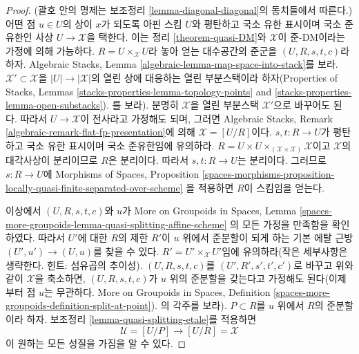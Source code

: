 \begin{proof}
(괄호 안의 명제는 보조정리 \ref{lemma-diagonal-diagonal}의 동치들에서
따른다.) 어떤 점 $u \in U$의 상이 $x$가 되도록 아핀 스킴 $U$와
평탄하고 국소 유한 표시이며 국소 준유한인 사상
$U \to \mathcal{X}$을 택한다. 이는 정리 \ref{theorem-quasi-DM}와
$\mathcal{X}$이 준-DM이라는 가정에 의해 가능하다.
$R = U \times_\mathcal{X} U$라 놓아 얻는 대수공간의 준군을
$(U, R, s, t, c)$라 하자. Algebraic Stacks, Lemma
\ref{algebraic-lemma-map-space-into-stack}를 보라.
$\mathcal{X}' \subset \mathcal{X}$을 $|U| \to |\mathcal{X}|$의 열린 상에
대응하는 열린 부분스택이라 하자(Properties of Stacks, Lemmas
\ref{stacks-properties-lemma-topology-points} and
\ref{stacks-properties-lemma-open-substacks}).
를 보라). 분명히 $\mathcal{X}$을 열린 부분스택 $\mathcal{X}'$으로 바꾸어도
된다. 따라서 $U \to \mathcal{X}$이 전사라고 가정해도 되며, 그러면
Algebraic Stacks, Remark \ref{algebraic-remark-flat-fp-presentation}에 의해
$\mathcal{X} = [U/R]$이다. $s, t : R \to U$가 평탄하고 국소 유한
표시이며 국소 준유한임에 유의하라.
$R = U \times U \times_{(\mathcal{X} \times \mathcal{X})} \mathcal{X}$이고
$\mathcal{X}$의 대각사상이 분리이므로 $R$은 분리이다. 따라서
$s, t : R \to U$는 분리이다. 그러므로 $s : R \to U$에 Morphisms of
Spaces, Proposition
\ref{spaces-morphisms-proposition-locally-quasi-finite-separated-over-scheme}
을 적용하면 $R$이 스킴임을 얻는다.

\medskip\noindent
이상에서 $(U, R, s, t, c)$와 $u$가 More on Groupoids in Spaces, Lemma
\ref{spaces-more-groupoids-lemma-quasi-splitting-affine-scheme}
의 모든 가정을 만족함을 확인하였다. 따라서 $U'$에 대한 $R$의 제한
$R'$이 $u$ 위에서 준분할이 되게 하는 기본 에탈 근방
$(U', u') \to (U, u)$를 찾을 수 있다.
$R' = U' \times_\mathcal{X} U'$임에 유의하라(작은 세부사항은 생략한다.
힌트: 섬유곱의 추이성). $(U, R, s, t, c)$를
$(U', R', s', t', c')$로 바꾸고 위와 같이 $\mathcal{X}$을 축소하면,
$(U, R, s, t, c)$가 $u$ 위의 준분할을 갖는다고 가정해도 된다(이제부터
점 $u$는 무관하다. More on Groupoids in Spaces, Definition
\ref{spaces-more-groupoids-definition-split-at-point}).
의 각주를 보라). $P \subset R$를 $u$ 위에서 $R$의 준분할이라 하자.
보조정리 \ref{lemma-quasi-splitting-etale}를 적용하면
$$
\mathcal{U} = [U/P] \longrightarrow [U/R] = \mathcal{X}
$$
이 원하는 모든 성질을 가짐을 알 수 있다.
\end{proof}

